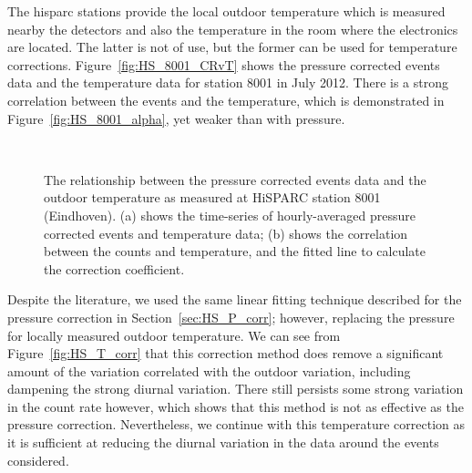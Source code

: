 The \gls{hisparc} stations provide the local outdoor temperature which is measured nearby the detectors and also the temperature in the room where the electronics are located. The latter is not of use, but the former can be used for temperature corrections. Figure~\ref{fig:HS_8001_CRvT} shows the pressure corrected events data and the temperature data for station 8001 in July 2012. There is a strong correlation between the events and the temperature, which is demonstrated in Figure~\ref{fig:HS_8001_alpha}, yet weaker than with pressure.

\begin{figure}[ht!]
	\centering
	 \\
	
	\caption{The relationship between the pressure corrected events data and the outdoor temperature as measured at HiSPARC station 8001 (Eindhoven). (a) shows the time-series of hourly-averaged pressure corrected events and temperature data; (b) shows the correlation between the counts and temperature, and the fitted line to calculate the correction coefficient.}
	\label{fig:CR_V_T}
\end{figure}

Despite the literature, we used the same linear fitting technique described for the pressure correction in Section~\ref{sec:HS_P_corr}; however, replacing the pressure for locally measured outdoor temperature. We can see from Figure~\ref{fig:HS_T_corr} that this correction method does remove a significant amount of the variation correlated with the outdoor variation, including dampening the strong diurnal variation. There still persists some strong variation in the count rate however, which shows that this method is not as effective as the pressure correction. Nevertheless, we continue with this temperature correction as it is sufficient at reducing the diurnal variation in the data around the events considered.
 
